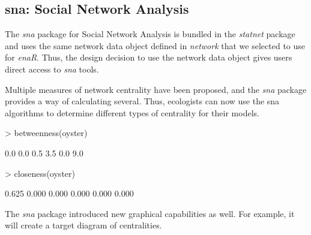 \documentclass[article]{jss}
\begin{document}
\subsection{sna: Social Network Analysis}
The \textit{sna} package for Social Network Analysis is bundled in the
\textit{statnet} package and uses the same network data object defined
in \textit{network} that we selected to use for \textit{enaR}.  Thus,
the design decision to use the network data object gives users direct
access to \textit{sna} tools.

Multiple measures of network centrality have been proposed, and the
\textit{sna} package provides a way of calculating several.  Thus,
ecologists can now use the sna algorithms to determine different types
of centrality for their models.

\begin{Schunk}
\begin{Sinput}
> betweenness(oyster)
\end{Sinput}
\begin{Soutput}
[1] 0.0 0.0 0.5 3.5 0.0 9.0
\end{Soutput}
\begin{Sinput}
> closeness(oyster)
\end{Sinput}
\begin{Soutput}
[1] 0.625 0.000 0.000 0.000 0.000 0.000
\end{Soutput}
\end{Schunk}

The \textit{sna} package introduced new graphical capabilities as
well. For example, it will create a target diagram of centralities.

\end{document}
